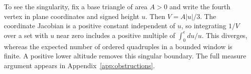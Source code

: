 To see the singularity, fix a base triangle of area $A>0$ and write the fourth vertex in plane coordinates and signed height $u$. Then $V=A|u|/3$. The coordinate Jacobian is a positive constant independent of $u$, so integrating $1/V$ over a set with $u$ near zero includes a positive multiple of $\int_0^\epsilon du/u$. This diverges, whereas the expected number of ordered quadruples in a bounded window is finite. A positive lower altitude removes this singular boundary. The full measure argument appears in Appendix~\ref{app:obstructions}.
